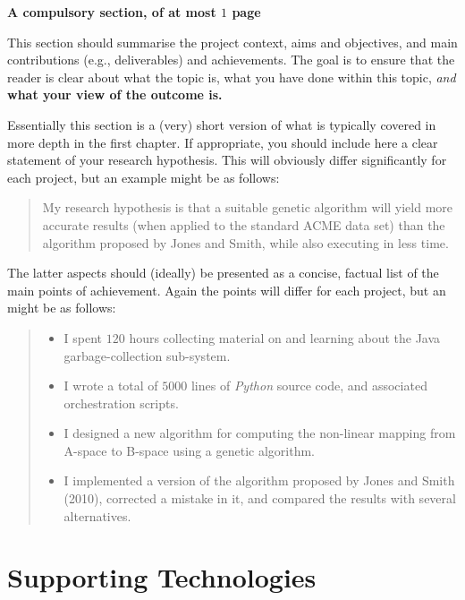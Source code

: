 \documentclass[ %
                    author={Natchalin Iwsakul \\ Inkaphol Siriwongwattana \\ Tanaphan Kummaraphat \\ Patorn Srisupap},
                supervisor={Fernando Moreno-Pino},
                    degree={MSc},
                     title={Propensity Modelling for SME Commercial Lending Using Open Public Data},
                  subtitle={Companies House filings and GDELT media coverage as predictors of first-time borrowing},
                      type={},
                      year={2026}]{dissertation}
\begin{document}
{\bf A compulsory section, of at most $1$ page} 
\vspace{1cm} 

\noindent
This section should summarise the project context, aims and objectives,
and main contributions (e.g., deliverables) and achievements.  The goal is to ensure that the 
reader is clear about what the topic is, what you have done within this 
topic, {\em and}\/ {\bf what your view of the outcome is.}

Essentially 
this section is a (very) short version of what is typically covered in more depth in the first 
chapter.  If appropriate, you should include here  
a clear statement of your research hypothesis.  This will obviously differ significantly
for each project, but an example might be as follows:

\begin{quote}
My research hypothesis is that a suitable genetic algorithm will yield
more accurate results (when applied to the standard ACME data set) than 
the algorithm proposed by Jones and Smith, while also executing in less
time.
\end{quote}

\noindent
The latter aspects should (ideally) be presented as a concise, factual 
list of the main points of achievement.  Again the points will differ for each project, but 
an might be as follows:

\begin{quote}
\noindent
\begin{itemize}
\item I spent $120$ hours collecting material on and learning about the 
      Java garbage-collection sub-system. 
\item I wrote a total of $5000$ lines of {\em Python} source code, and associated orchestration scripts. 
\item I designed a new algorithm for computing the non-linear mapping 
      from A-space to B-space using a genetic algorithm.
\item I implemented a version of the algorithm proposed by Jones and 
      Smith (2010), corrected a mistake in it, and 
      compared the results with several alternatives.
\end{itemize}
\end{quote}




\chapter*{Supporting Technologies}
\end{document}
